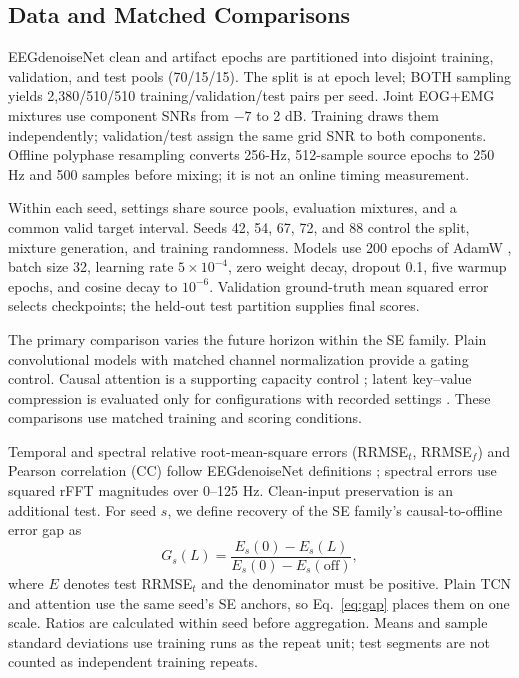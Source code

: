 \documentclass[letterpaper,journal]{IEEEtran}
\begin{document}
\subsection{Data and Matched Comparisons}
EEGdenoiseNet \cite{EEGdenoiseNet} clean and artifact epochs are partitioned into disjoint training, validation, and test pools (70/15/15). The split is at epoch level; BOTH sampling yields 2,380/510/510 training/validation/test pairs per seed. Joint EOG+EMG mixtures use component SNRs from $-7$ to 2 dB. Training draws them independently; validation/test assign the same grid SNR to both components. Offline polyphase resampling converts 256-Hz, 512-sample source epochs to 250 Hz and 500 samples before mixing; it is not an online timing measurement.

Within each seed, settings share source pools, evaluation mixtures, and a common valid target interval. Seeds 42, 54, 67, 72, and 88 control the split, mixture generation, and training randomness. Models use 200 epochs of AdamW \cite{loshchilov2019adamw}, batch size 32, learning rate $5\times10^{-4}$, zero weight decay, dropout 0.1, five warmup epochs, and cosine decay to $10^{-6}$. Validation ground-truth mean squared error selects checkpoints; the held-out test partition supplies final scores.

The primary comparison varies the future horizon within the SE family. Plain convolutional models with matched channel normalization provide a gating control. Causal attention is a supporting capacity control \cite{vaswani2017attention}; latent key--value compression is evaluated only for configurations with recorded settings \cite{deepseekai2024deepseekv2}. These comparisons use matched training and scoring conditions.

Temporal and spectral relative root-mean-square errors (RRMSE$_t$, RRMSE$_f$) and Pearson correlation (CC) follow EEGdenoiseNet definitions \cite{EEGdenoiseNet}; spectral errors use squared rFFT magnitudes over 0--125 Hz. Clean-input preservation is an additional test. For seed $s$, we define recovery of the SE family's causal-to-offline error gap as
\begin{equation}
 G_s(L)=\frac{E_s(0)-E_s(L)}{E_s(0)-E_s(\mathrm{off})},
 \label{eq:gap}
\end{equation}
where $E$ denotes test RRMSE$_t$ and the denominator must be positive. Plain TCN and attention use the same seed's SE anchors, so Eq.~\eqref{eq:gap} places them on one scale. Ratios are calculated within seed before aggregation. Means and sample standard deviations use training runs as the repeat unit; test segments are not counted as independent training repeats.
\end{document}
